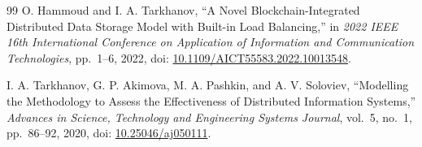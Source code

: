 \documentclass{misisarticle}
\begin{document}
\begin{thebibliography}{99}
 O. Hammoud and I. A. Tarkhanov, ``A Novel Blockchain-Integrated Distributed Data Storage Model with Built-in Load Balancing,'' in \textit{2022 IEEE 16th International Conference on Application of Information and Communication Technologies}, pp.~1--6, 2022, doi: \href{https://doi.org/10.1109/AICT55583.2022.10013548}{10.1109/AICT55583.2022.10013548}.

 I. A. Tarkhanov, G. P. Akimova, M. A. Pashkin, and A. V. Soloviev, ``Modelling the Methodology to Assess the Effectiveness of Distributed Information Systems,'' \textit{Advances in Science, Technology and Engineering Systems Journal}, vol.~5, no.~1, pp.~86--92, 2020, doi: \href{https://doi.org/10.25046/aj050111}{10.25046/aj050111}.

\end{thebibliography}
\end{document}
